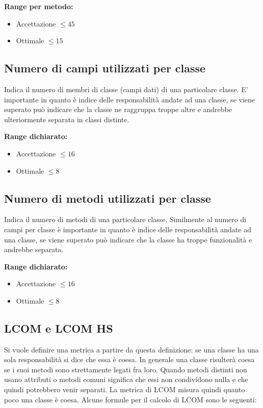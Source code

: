 \textbf{Range per metodo:}
\begin{itemize}
\item Accettazione $\leq 45$
\item Ottimale $\leq 15$
\end{itemize}

\subsection{Numero di campi utilizzati per classe}

Indica il numero di membri di classe (campi dati) di una particolare classe. E'
importante in quanto è indice delle responsabilità andate ad una classe, se viene
superato può indicare che la classe ne raggruppa troppe altre e andrebbe ulteriormente
separata in classi distinte.

\textbf{Range dichiarato:}
\begin{itemize}
\item Accettazione $\leq 16$
\item Ottimale $\leq 8$
\end{itemize}

\subsection{Numero di metodi utilizzati per classe}

Indica il numero di metodi di una particolare classe. Similmente al numero di campi
per classe è importante in quanto è indice delle responsabilità andate ad una classe, se
viene superato può indicare che la classe ha troppe funzionalità e andrebbe separata.

\textbf{Range dichiarato:}
\begin{itemize}
\item Accettazione $\leq 16$
\item Ottimale $\leq 8$
\end{itemize}

\subsection{LCOM e LCOM HS}

Si vuole definire una metrica a partire da questa definizione: se una classe ha una sola responsabilità si
dice che essa è coesa. In generale una classe risulterà coesa se i suoi metodi sono
strettamente legati fra loro. Quando metodi distinti non usano attributi o metodi
comuni significa che essi non condividono nulla e che quindi potrebbero venir separati.
La metrica di LCOM misura quindi quanto poco una classe è coesa. Alcune formule per il
calcolo di LCOM sono le seguenti:

